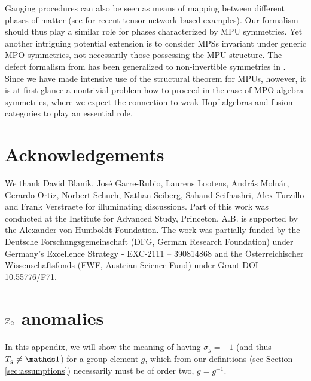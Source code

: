 \documentclass[reprint,
superscriptaddress,
amsmath,amssymb,
notitlepage,
aps,
prb,
10pt, 
tightenlines
]{revtex4-2}
\begin{document}
Gauging procedures can also be seen as means of mapping between different phases of matter (see \cite{Lootens_2023, rubio2024, BlanikGarreSchuch} for recent tensor network-based examples). Our formalism should thus play a similar role for phases characterized by MPU symmetries. Yet another intriguing potential extension is to consider MPSs invariant under generic MPO symmetries, not necessarily those possessing the MPU structure. The defect formalism from \cite{Seifnashri} has been generalized to non-invertible symmetries in \cite{SSS}. Since we have made intensive use of the structural theorem for MPUs, however, it is at first glance a nontrivial problem how to proceed in the case of MPO algebra symmetries, where we expect the connection to weak Hopf algebras \cite{weakHopf} and fusion categories to play an essential role. 

\section{Acknowledgements}
We thank David Blanik, Jos\'{e} Garre-Rubio, Laurens Lootens, András Molnár, Gerardo Ortiz, Norbert Schuch, Nathan Seiberg, Sahand Seifnashri, Alex Turzillo and Frank Verstraete for illuminating discussions. Part of this work was conducted at the Institute for Advanced Study, Princeton. A.B. is supported by the Alexander von Humboldt Foundation. The work was partially funded by the Deutsche Forschungsgemeinschaft (DFG, German Research Foundation) under Germany’s Excellence Strategy - EXC-2111 – 390814868 and the Österreichischer Wissenschaftsfonds (FWF, Austrian Science Fund) under Grant DOI 10.55776/F71.

\appendix

\section{$\mathbb{Z}_2$ anomalies}
\label{app:Z2}
In this appendix, we will show the meaning of having $\sigma_g=-1$ (and thus $T_g\neq\I$) for a group element $g$, which from our definitions (see Section \ref{sec:assumptions}) necessarily must be of order two, $g=g^{-1}$. 
\end{document}
